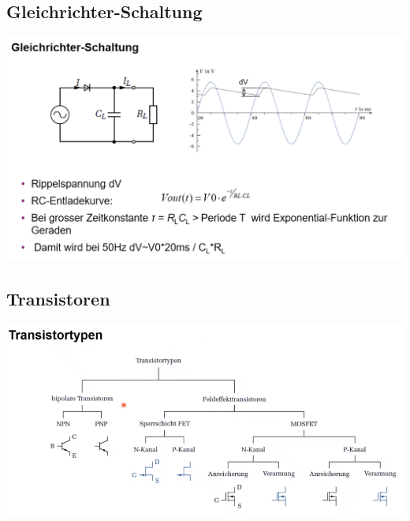\subsection{Gleichrichter-Schaltung}
\includegraphics[width=\columnwidth]{Images/gleichrichter}


\subsection{Transistoren}
\includegraphics[width=\columnwidth]{Images/transistortypen}


